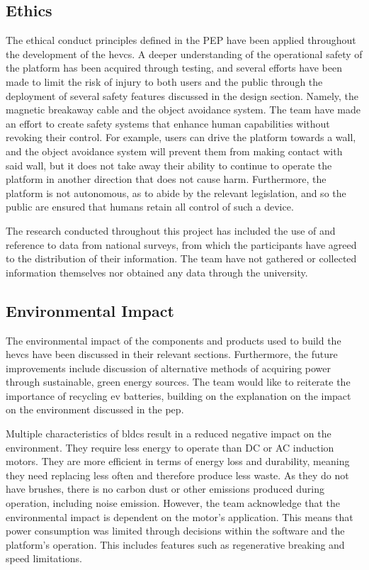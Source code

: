 \documentclass [12pt]{article}
\begin{document}
\subsection{Ethics}

The ethical conduct principles defined in the PEP have been applied throughout the development of the \gls{hevcs}. A deeper understanding of the operational safety of the platform has been acquired through testing, and several efforts have been made to limit the risk of injury to both users and the public through the deployment of several safety features discussed in the design section. Namely, the magnetic breakaway cable and the object avoidance system. The team have made an effort to create safety systems that enhance human capabilities without revoking their control. For example, users can drive the platform towards a wall, and the object avoidance system will prevent them from making contact with said wall, but it does not take away their ability to continue to operate the platform in another direction that does not cause harm. Furthermore, the platform is not autonomous, as to abide by the relevant legislation, and so the public are ensured that humans retain all control of such a device.

The research conducted throughout this project has included the use of and reference to data from national surveys, from which the participants have agreed to the distribution of their information. The team have not gathered or collected information themselves nor obtained any data through the university.

\subsection{Environmental Impact}

The environmental impact of the components and products used to build the \gls{hevcs} have been discussed in their relevant sections. Furthermore, the future improvements include discussion of alternative methods of acquiring power through sustainable, green energy sources. The team would like to reiterate the importance of recycling \gls{ev} batteries, building on the explanation on the impact on the environment discussed in the \gls{pep}.

Multiple characteristics of \gls{bldc}s result in a reduced negative impact on the environment. They require less energy to operate than DC or AC induction motors. They are more efficient in terms of energy loss and durability, meaning they need replacing less often and therefore produce less waste. As they do not have brushes, there is no carbon dust or other emissions produced during operation, including noise emission. However, the team acknowledge that the environmental impact is dependent on the motor’s application. This means that power consumption was limited through decisions within the software and the platform’s operation. This includes features such as regenerative breaking and speed limitations.
\end{document}
